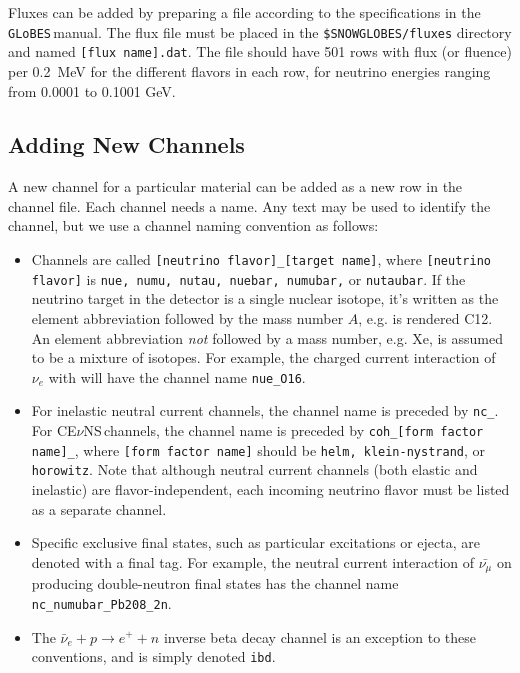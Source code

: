 \documentclass{article}
\newcommand{\cev}{CE$\nu$NS\,}
\newcommand{\glb}{\texttt{GLoBES}\,}
\begin{document}
Fluxes can be added by preparing a file according to the specifications in the \glb manual.  The flux file must be placed in the \texttt{\$SNOWGLOBES/fluxes} directory and named
\texttt{[flux name].dat}. The file should have 501 rows with flux (or fluence) per 0.2~MeV for the different flavors in each row, for neutrino energies ranging from 0.0001 to 0.1001 GeV.

\subsection{Adding New Channels}\label{subsec:addingchannel}

A new channel for a particular material can be added as a new row in the channel file.  Each channel needs a name.  Any text may be used to identify the channel, but we use a channel naming convention as follows: 

\begin{itemize}
    \item  Channels are called \texttt{[neutrino flavor]\_[target name]}, where \texttt{[neutrino flavor]} is \texttt{nue, numu, nutau, nuebar, numubar,} or \texttt{nutaubar}.  If the neutrino target in the detector is a single nuclear isotope, it's written as the element abbreviation followed by the mass number $A$, e.g.  is rendered C12. An element abbreviation \textit{not} followed by a mass number, e.g. Xe, is assumed to be a mixture of isotopes. For example, the charged current interaction of $\nu_e$ with  will have the channel name \texttt{nue\_O16}.
    
    \item For inelastic neutral current channels, the channel name is preceded by \texttt{nc\_}. For \cev channels, the channel name is preceded by \texttt{coh\_[form factor name]\_}, where \texttt{[form factor name]} should be \texttt{helm, klein-nystrand}, or \texttt{horowitz}. Note that although neutral current channels (both elastic and inelastic) are flavor-independent, each incoming neutrino flavor must be listed as a separate channel.
    
    \item Specific exclusive final states, such as particular excitations or ejecta, are denoted with a final tag. For example, the neutral current interaction of $\bar{\nu_\mu}$ on  producing double-neutron final states has the channel name \texttt{nc\_numubar\_Pb208\_2n}.
    
    \item The $\bar{\nu}_e+ p \rightarrow e^+ + n$ inverse beta decay channel is an exception to these conventions, and is simply denoted \texttt{ibd}.
\end{itemize}
\end{document}
